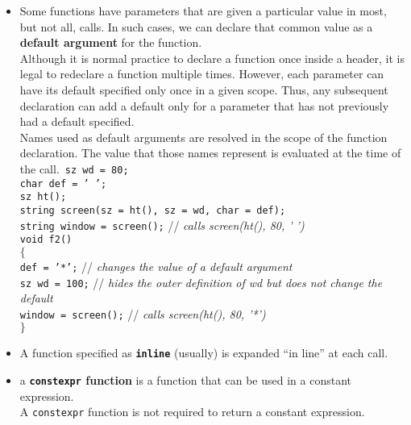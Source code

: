 \begin{itemize}
\item
Some functions have parameters that are given a particular value in most, but not all, calls. In such cases, we can declare that common value as a \textbf{default argument} for the function.\\
Although it is normal practice to declare a function once inside a header, it is legal to redeclare a function multiple times. However, each parameter can have its default specified only once in a given scope. Thus, any subsequent declaration can add a default only for a parameter that has not previously had a default specified.\\
Names used as default arguments are resolved in the scope of the function declaration. The value that those names represent is evaluated at the time of the call.\
\hspace*{1em}\texttt{sz wd = 80;}\\
\hspace*{1em}\texttt{char def = ' ';}\\
\hspace*{1em}\texttt{sz ht();}\\
\hspace*{1em}\texttt{string screen(sz = ht(), sz = wd, char = def);}\\
\hspace*{1em}\texttt{string window = screen();} // \textit{calls screen(ht(), 80, ' ')}\\
\hspace*{1em}\texttt{void f2()}\\
\hspace*{1em}\texttt{$\{$}\\
\hspace*{3em}\texttt{def = '*';} // \textit{changes the value of a default argument}\\
\hspace*{3em}\texttt{sz wd = 100;} // \textit{hides the outer definition of wd but does not change the default}\\
\hspace*{3em}\texttt{window = screen();} // \textit{calls screen(ht(), 80, '*')}\\
\hspace*{1em}\texttt{$\}$}

\item
A function specified as \textbf{\texttt{inline}} (usually) is expanded ``in line'' at each call.

\item
a \textbf{\texttt{constexpr} function} is a function that can be used in a constant expression.\\
A \texttt{constexpr} function is not required to return a constant expression.


\end{itemize}
